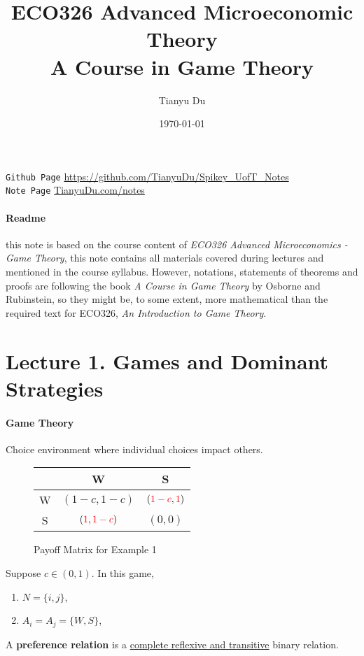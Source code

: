 \documentclass[11pt]{article}
\title{ECO326 Advanced Microeconomic Theory \\ \small A Course in Game Theory}
\author{Tianyu Du}
\date{\today}
\newcommand{\red}[1]{\textcolor{red}{#1}}
\begin{document}
	\maketitle
	\doclicenseThis
	\texttt{Github Page} \url{https://github.com/TianyuDu/Spikey_UofT_Notes}\\
	\texttt{Note Page} \url{TianyuDu.com/notes}
	\paragraph{Readme} this note is based on the course content of \emph{ECO326 Advanced Microeconomics - Game Theory}, this note contains all materials covered during lectures and mentioned in the course syllabus. However, notations, statements of theorems and proofs are following the book \emph{A Course in Game Theory} by Osborne and Rubinstein, so they might be, to some extent, more mathematical than the required text for ECO326, \emph{An Introduction to Game Theory}.
	
	\tableofcontents
	\newpage
	
	\section{Lecture 1. Games and Dominant Strategies}
		\paragraph{Game Theory} Choice environment where individual choices impact others.
		
		\begin{example}
			\begin{figure}[h]
				\centering
				  \begin{tabular}{c|c|c}
				    & W & S\\
				    \hline
				    W & $(1-c, 1-c)$ & $(\red{1-c}, \red{1})$ \\
				    \hline
				    S & $(\red{1}, \red{1-c})$ & $(0, 0)$
				  \end{tabular}
				  \caption{Payoff Matrix for Example 1}
			\end{figure}
		\end{example}
		Suppose $c \in (0, 1)$. In this game,
		\begin{enumerate}[i]
			\item $N = \{i, j\}$,
			\item $A_i = A_j = \{W, S\}$,
		\end{enumerate}
		
		\begin{definition}[pg.7]
			A \textbf{preference relation} is a \ul{complete reflexive and transitive} binary relation.
		\end{definition}
		
\end{document}
